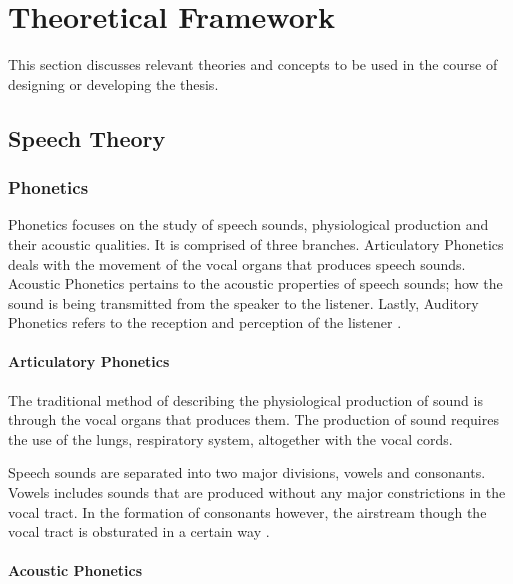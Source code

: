 %
%
%                 
%

\chapter{Theoretical Framework}
This section discusses relevant theories and concepts to be used in the course of designing or developing the thesis.

\section{Speech Theory}

\subsection{Phonetics}
Phonetics focuses on the study of speech sounds, physiological production and their acoustic qualities. It is comprised of three branches. Articulatory Phonetics deals with the movement of the vocal organs that produces speech sounds. Acoustic Phonetics pertains to the acoustic properties of speech sounds; how the sound is being transmitted from the speaker to the listener. Lastly, Auditory Phonetics refers to the reception and perception of the listener \cite{britannica:2014:phoetics}.

\subsubsection{Articulatory Phonetics}
The traditional method of describing the physiological production of sound is through the vocal organs that produces them. The production of sound requires the use of the lungs, respiratory system, altogether with the vocal cords.

Speech sounds are separated into two major divisions, vowels and consonants. Vowels includes sounds that are produced without any major constrictions in the vocal tract. In the formation of consonants however, the airstream though the vocal tract is obsturated in a certain way \cite{britannica:2014:phoetics}.

\subsubsection{Acoustic Phonetics}

